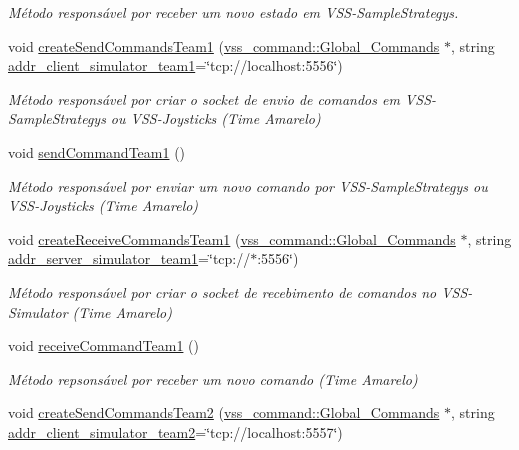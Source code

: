 \begin{DoxyCompactItemize}
\begin{DoxyCompactList}\small\item\em Método responsável por receber um novo estado em V\+S\+S-\/\+Sample\+Strategys. \end{DoxyCompactList}\item 
void \hyperlink{classInterface_af17ffaf827d0090bdbfca933dcb1318a}{create\+Send\+Commands\+Team1} (\hyperlink{classvss__command_1_1Global__Commands}{vss\+\_\+command\+::\+Global\+\_\+\+Commands} $\ast$, string \hyperlink{classInterface_a5fd23546358caf45c28aab623783aa74}{addr\+\_\+client\+\_\+simulator\+\_\+team1}=\char`\"{}tcp\+://localhost\+:5556\char`\"{})
\begin{DoxyCompactList}\small\item\em Método responsável por criar o socket de envio de comandos em V\+S\+S-\/\+Sample\+Strategys ou V\+S\+S-\/\+Joysticks (Time Amarelo) \end{DoxyCompactList}\item 
void \hyperlink{classInterface_af4e4676f7bb5d14c3f1606a9b4ab01e1}{send\+Command\+Team1} ()
\begin{DoxyCompactList}\small\item\em Método responsável por enviar um novo comando por V\+S\+S-\/\+Sample\+Strategys ou V\+S\+S-\/\+Joysticks (Time Amarelo) \end{DoxyCompactList}\item 
void \hyperlink{classInterface_ada4efcce0e1b10c89cea6f24891490ba}{create\+Receive\+Commands\+Team1} (\hyperlink{classvss__command_1_1Global__Commands}{vss\+\_\+command\+::\+Global\+\_\+\+Commands} $\ast$, string \hyperlink{classInterface_afe824e3c6a845f60ef4e95592d6aea8c}{addr\+\_\+server\+\_\+simulator\+\_\+team1}=\char`\"{}tcp\+://$\ast$\+:5556\char`\"{})
\begin{DoxyCompactList}\small\item\em Método responsável por criar o socket de recebimento de comandos no V\+S\+S-\/\+Simulator (Time Amarelo) \end{DoxyCompactList}\item 
void \hyperlink{classInterface_a1e553942adde8b27c3df9dcc1e8cfaa6}{receive\+Command\+Team1} ()
\begin{DoxyCompactList}\small\item\em Método repsonsável por receber um novo comando (Time Amarelo) \end{DoxyCompactList}\item 
void \hyperlink{classInterface_a95658bd3b45221e76f354583b619b9e2}{create\+Send\+Commands\+Team2} (\hyperlink{classvss__command_1_1Global__Commands}{vss\+\_\+command\+::\+Global\+\_\+\+Commands} $\ast$, string \hyperlink{classInterface_a3350d92b68427e361d42e403cd0402ea}{addr\+\_\+client\+\_\+simulator\+\_\+team2}=\char`\"{}tcp\+://localhost\+:5557\char`\"{})

\end{DoxyCompactItemize}
